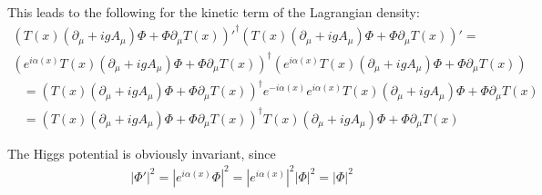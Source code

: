 \documentclass{article}
\theoremstyle{definition}
\theoremstyle{remark}
\newcommand{\Tfield}{T(x)} %
\newcommand{\DhiggsTdef}{\Tfield (\partial_\mu + igA_\mu)\Phi + \Phi \partial_\mu \Tfield}
\begin{document}
	This leads to the following for the kinetic term of the Lagrangian density:
	\begin{multline}
		{(\DhiggsTdef)'}^\dagger(\DhiggsTdef)' = \\
		(e^{i\alpha(x)}\DhiggsTdef)^\dagger(e^{i\alpha(x)}\DhiggsTdef)
	\end{multline}
	\begin{align}
		&= (\DhiggsTdef)^\dagger e^{-i\alpha(x)} e^{i\alpha(x)} \DhiggsTdef \\
		&= (\DhiggsTdef)^\dagger \DhiggsTdef
	\end{align}
	
	The Higgs potential is obviously invariant, since
	\begin{align}
		&|\Phi'|^2 = |e^{i\alpha(x)}\Phi|^2 = |e^{i\alpha(x)}|^2|\Phi|^2 = |\Phi|^2
	\end{align}
	
\end{document}
